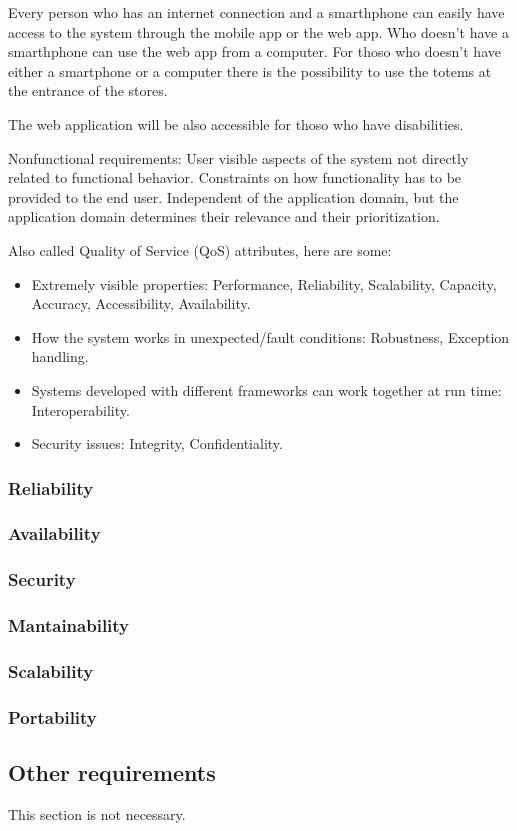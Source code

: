 Every person who has an internet connection and a smarthphone can easily have access to the system through the mobile app or the web app. Who doesn't have a smarthphone can use the web app from a computer. For thoso who doesn't have either a smartphone or a computer there is the possibility to use the totems at the entrance of the stores.

The web application will be also accessible for thoso who have disabilities.

Nonfunctional requirements: User visible aspects of the system not directly related to functional behavior. 
Constraints on how functionality has to be provided to the end user.
Independent of the application domain, but the application domain determines their relevance and their prioritization.

Also called Quality of Service (QoS) attributes, here are some:
\begin{itemize}
    \item Extremely visible properties: Performance, Reliability, Scalability, Capacity, Accuracy, Accessibility, Availability.
    \item How the system works in unexpected/fault conditions: Robustness, Exception handling.
    \item Systems developed with different frameworks can work together at run time: Interoperability.
    \item Security issues: Integrity, Confidentiality.
\end{itemize}

\subsubsection{Reliability}
\label{subsubsect:reliability}

\subsubsection{Availability}
\label{subsubsect:availability}

\subsubsection{Security}
\label{subsubsect:security}

\subsubsection{Mantainability}
\label{subsubsect:mantainability}

\subsubsection{Scalability}
\label{subsubsect:scalability}

\subsubsection{Portability}
\label{subsubsect:portability}

\subsection{Other requirements}
\label{subsect:otherrequirements}

This section is not necessary.

